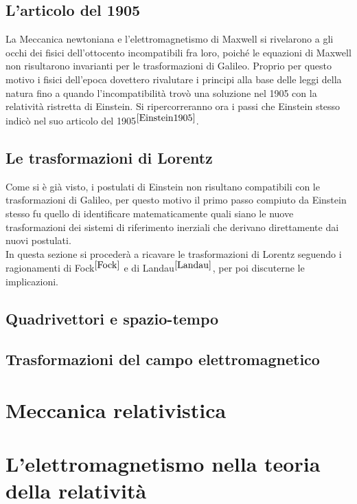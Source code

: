 \documentclass[12pt,a4paper]{report}
\numberwithin{equation}{section}
\begin{document}
\begin{sloppypar}
\section{L'articolo del 1905}
La Meccanica newtoniana e l'elettromagnetismo di Maxwell si rivelarono a gli occhi dei fisici dell'ottocento 
incompatibili fra loro, 
poiché le equazioni di Maxwell non risultarono invarianti per le trasformazioni di Galileo. 
Proprio per questo motivo i fisici dell'epoca dovettero rivalutare i principi alla base delle leggi 
della natura fino a quando l'incompatibilità trovò una soluzione nel 1905 con la relatività ristretta di Einstein.
 Si ripercorreranno ora i passi che Einstein stesso indicò nel suo articolo del 1905$^{\cite{Einstein1905}}$.



\section{Le trasformazioni di Lorentz}
Come si è già visto, i postulati di Einstein non risultano compatibili con le trasformazioni di Galileo, 
per questo motivo il primo passo compiuto da Einstein stesso fu quello di identificare matematicamente quali siano 
le nuove trasformazioni dei sistemi di riferimento inerziali che derivano direttamente dai nuovi postulati.\\
In questa sezione si procederà a ricavare le trasformazioni di Lorentz seguendo i ragionamenti di Fock$^{\cite{Fock}}$ e di Landau$ ^{\cite{Landau}}$, 
per poi discuterne le implicazioni.  




\section{Quadrivettori e spazio-tempo}


\section{Trasformazioni del campo elettromagnetico}


\chapter{Meccanica relativistica}

\chapter{L'elettromagnetismo nella teoria della relatività}

\appendix





\end{sloppypar}
\end{document}
